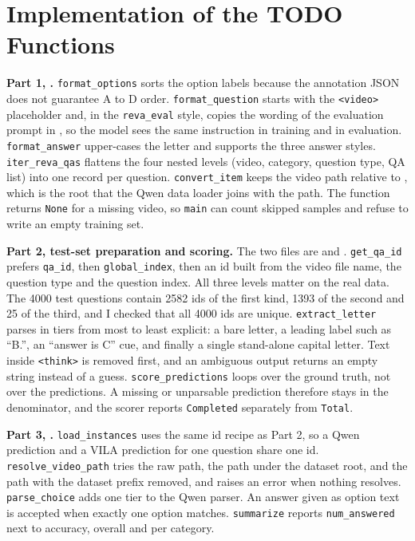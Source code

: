 \documentclass[11pt]{article}
\begin{document}
\section{Implementation of the TODO Functions}

\textbf{Part 1, .} \texttt{format\_options} sorts the option labels because the annotation JSON does not guarantee A to D order. \texttt{format\_question} starts with the \texttt{<video>} placeholder and, in the \texttt{reva\_eval} style, copies the wording of the evaluation prompt in , so the model sees the same instruction in training and in evaluation. \texttt{format\_answer} upper-cases the letter and supports the three answer styles. \texttt{iter\_reva\_qas} flattens the four nested levels (video, category, question type, QA list) into one record per question. \texttt{convert\_item} keeps the video path relative to , which is the root that the Qwen data loader joins with the path. The function returns \texttt{None} for a missing video, so \texttt{main} can count skipped samples and refuse to write an empty training set.

\textbf{Part 2, test-set preparation and scoring.} The two files are  and . \texttt{get\_qa\_id} prefers \texttt{qa\_id}, then \texttt{global\_index}, then an id built from the video file name, the question type and the question index. All three levels matter on the real data. The 4000 test questions contain 2582 ids of the first kind, 1393 of the second and 25 of the third, and I checked that all 4000 ids are unique. \texttt{extract\_letter} parses in tiers from most to least explicit: a bare letter, a leading label such as ``B.'', an ``answer is C'' cue, and finally a single stand-alone capital letter. Text inside \texttt{<think>} is removed first, and an ambiguous output returns an empty string instead of a guess. \texttt{score\_predictions} loops over the ground truth, not over the predictions. A missing or unparsable prediction therefore stays in the denominator, and the scorer reports \texttt{Completed} separately from \texttt{Total}.

\textbf{Part 3, .} \texttt{load\_instances} uses the same id recipe as Part 2, so a Qwen prediction and a VILA prediction for one question share one id. \texttt{resolve\_video\_path} tries the raw path, the path under the dataset root, and the path with the dataset prefix removed, and raises an error when nothing resolves. \texttt{parse\_choice} adds one tier to the Qwen parser. An answer given as option text is accepted when exactly one option matches. \texttt{summarize} reports \texttt{num\_answered} next to accuracy, overall and per category.
\end{document}
